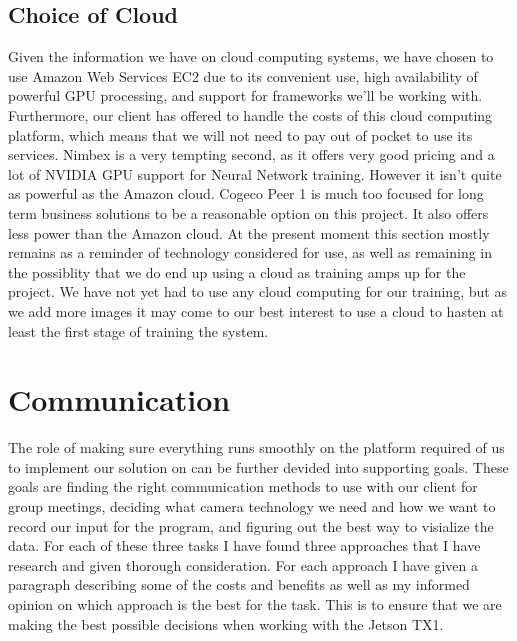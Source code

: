 \documentclass{scrreprt}
\begin{document}
\subsection{Choice of Cloud}
Given the information we have on cloud computing systems, we have chosen to use Amazon Web Services EC2 due to its convenient use, high availability of powerful GPU processing, and support for frameworks we’ll be working with. 
Furthermore, our client has offered to handle the costs of this cloud computing platform, which means that we will not need to pay out of pocket to use its services. 
Nimbex is a very tempting second, as it offers very good pricing and a lot of NVIDIA GPU support for Neural Network training. However it isn’t quite as powerful as the Amazon cloud. 
Cogeco Peer 1 is much too focused for long term business solutions to be a reasonable option on this project. 
It also offers less power than the Amazon cloud.
\newline\newline
At the present moment this section mostly remains as a reminder of technology considered for use, as well as remaining in the possiblity that we do end up using a cloud as training amps up for the project.
We have not yet had to use any cloud computing for our training, but as we add more images it may come to our best interest to use a cloud to hasten at least the first stage of training the system.

\section{Communication}
The role of making sure everything runs smoothly on the platform required of us to implement our solution on can be further devided into supporting goals.
These goals are finding the right communication methods to use with our client for group meetings, deciding what camera technology we need and how we want to record our input for the program, and figuring out the best way to visialize the data.
For each of these three tasks I have found three approaches that I have research and given thorough consideration.
For each approach I have given a paragraph describing some of the costs and benefits as well as my informed opinion on which approach is the best for the task.
This is to ensure that we are making the best possible decisions when working with the Jetson TX1.
\end{document}
